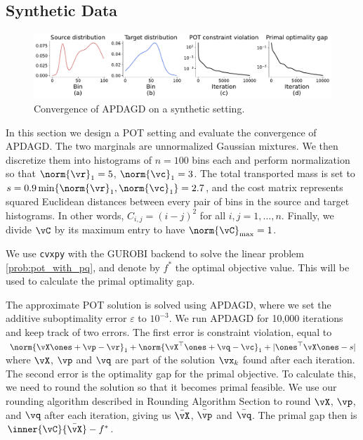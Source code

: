 \subsection{Synthetic Data}
\begin{figure}[ht]
    \centering
    \includegraphics[width=1\linewidth]{figs/apdagd_synthetic.pdf}
    \caption{Convergence of APDAGD on a synthetic setting.}
    \label{fig:apdagd_synthetic}
\end{figure}

In this section we design a POT setting and evaluate the convergence of APDAGD. The two marginals are unnormalized Gaussian mixtures. We then discretize them into histograms of $n = 100$ bins each and perform normalization so that $\norm{\vr}_1 = 5$, $\norm{\vc}_1 = 3$. The total transported mass is set to $s = 0.9 \min\{ \norm{\vr}_1, \norm{\vc}_1 \} = 2.7$, and the cost matrix represents squared Euclidean distances between every pair of bins in the source and target histograms. In other words, $C_{i, j} = (i - j)^2$ for all $i, j = 1, \ldots, n$. Finally, we divide $\vC$ by its maximum entry to have $\norm{\vC}_\text{max} = 1$.

We use \texttt{cvxpy} with the GUROBI backend to solve the linear problem \eqref{prob:pot_with_pq}, and denote by $f^*$ the optimal objective value. This will be used to calculate the primal optimality gap.

The approximate POT solution is solved using APDAGD, where we set the additive suboptimality error $\varepsilon$ to $10^{-3}$. We run APDAGD for 10,000 iterations and keep track of two errors. The first error is constraint violation, equal to $\norm{\vX \ones + \vp - \vr}_1 + \norm{\vX^\top \ones + \vq - \vc}_1 + \lvert \ones^\top \vX \ones - s \rvert$ where $\vX$, $\vp$ and $\vq$ are part of the solution $\vx_k$ found after each iteration. The second error is the optimality gap for the primal objective. To calculate this, we need to round the solution so that it becomes primal feasible. We use our rounding algorithm described in Rounding Algorithm Section to round $\vX$, $\vp$, and $\vq$ after each iteration, giving us $\bar{\vX}$, $\bar{\vp}$ and $\bar{\vq}$. The primal gap then is $\inner{\vC}{\bar{\vX}} - f^*$.

